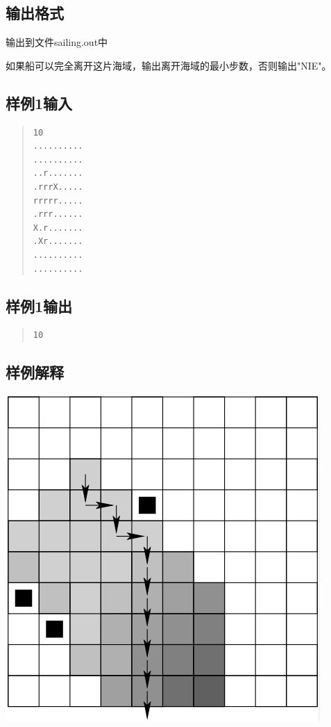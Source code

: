 \documentclass[12pt, a4paper]{article}
\begin{document}
\subsection{输出格式}

	输出到文件sailing.out中	

	如果船可以完全离开这片海域，输出离开海域的最小步数，否则输出"NIE"。

\subsection{样例1输入}
\begin{quote}
\begin{verbatim}
10
..........
..........
..r.......
.rrrX.....
rrrrr.....
.rrr......
X.r.......
.Xr.......
..........
..........
\end{verbatim}
\end{quote}
\subsection{样例1输出}
\begin{quote}
\begin{verbatim}
10
\end{verbatim}
\end{quote}
\subsection{样例解释}
\includegraphics[scale=0.5]{sailing.png}
\end{document}
